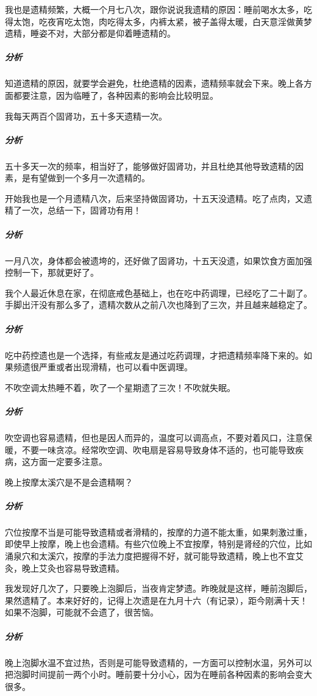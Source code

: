 \begin{case}
    我也是遗精频繁，大概一个月七八次，跟你说说我遗精的原因：睡前喝水太多，吃得太饱，吃夜宵吃太饱，肉吃得太多，内裤太紧，被子盖得太暖，白天意淫做黄梦遗精，睡姿不对，大部分都是仰着睡遗精的。
    \subparagraph{分析} 知道遗精的原因，就要学会避免，杜绝遗精的因素，遗精频率就会下来。晚上各方面都要注意，因为临睡了，各种因素的影响会比较明显。
\end{case}

\begin{case}
    我每天两百个固肾功，五十多天遗精一次。
    \subparagraph{分析} 五十多天一次的频率，相当好了，能够做好固肾功，并且杜绝其他导致遗精的因素，是有望做到一个多月一次遗精的。
\end{case}

\begin{case}
    开始我也是一个月遗精八次，后来坚持做固肾功，十五天没遗精。吃了点肉，又遗精了一次，总结一下，固肾功有用！
    \subparagraph{分析} 一月八次，身体都会被遗垮的，还好做了固肾功，十五天没遗，如果饮食方面加强控制一下，那就更好了。
\end{case}

\begin{case}
    我个人最近休息在家，在彻底戒色基础上，也在吃中药调理，已经吃了二十副了。手脚出汗没有那么多了，遗精次数从之前八次也降到了三次，并且越来越稳定了。
    \subparagraph{分析} 吃中药控遗也是一个选择，有些戒友是通过吃药调理，才把遗精频率降下来的。如果频遗很严重或者出现滑精，也可以看中医调理。
\end{case}

\begin{case}
    不吹空调太热睡不着，吹了一个星期遗了三次！不吹就失眠。
    \subparagraph{分析} 吹空调也容易遗精，但也是因人而异的，温度可以调高点，不要对着风口，注意保暖，不要一味贪凉。经常吹空调、吹电扇是容易导致身体不适的，也可能导致疾病，这方面一定要多注意。
\end{case}

\begin{case}
    晚上按摩太溪穴是不是会遗精啊？
    \subparagraph{分析} 穴位按摩不当是可能导致遗精或者滑精的，按摩的力道不能太重，如果刺激过重，即使早上按摩，晚上也会遗精。有些穴位晚上不宜按摩，特别是肾经的穴位，比如涌泉穴和太溪穴，按摩的手法力度把握得不好，就可能导致遗精，晚上也不宜艾灸，晚上艾灸也容易导致遗精。
\end{case}

\begin{case}
    我发现好几次了，只要晚上泡脚后，当夜肯定梦遗。昨晚就是这样，睡前泡脚后，果然遗精了。本来好好的，记得上次遗是在九月十六（有记录），距今刚满十天！如果不泡脚，可能就不会遗了，很苦恼。
    \subparagraph{分析} 晚上泡脚水温不宜过热，否则是可能导致遗精的，一方面可以控制水温，另外可以把泡脚时间提前一两个小时。睡前要十分小心，因为在睡前各种因素的影响会变大很多。
\end{case}

